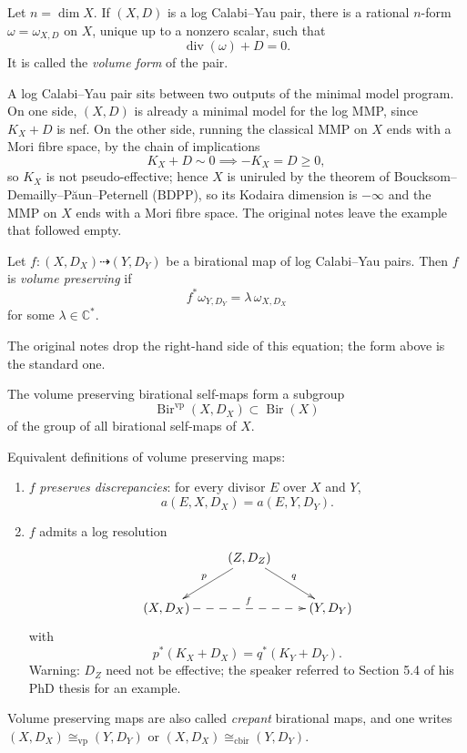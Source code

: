 \begin{remark}
\label{remark-alves-volume-form}
Let $n=\dim X$. If $(X,D)$ is a log
Calabi--Yau pair, there is a rational
$n$-form $\omega=\omega_{X,D}$ on $X$,
unique up to a nonzero scalar, such that
$$
\operatorname{div}(\omega)+D=0.
$$
It is called the \emph{volume form} of the
pair.
\end{remark}

A log Calabi--Yau pair sits between two
outputs of the minimal model program. On one
side, $(X,D)$ is already a minimal model for
the log MMP, since $K_X+D$ is nef. On the
other side, running the classical MMP on
$X$ ends with a Mori fibre space, by the
chain of implications
$$
K_X+D\sim 0
\implies
-K_X=D\geq 0,
$$
so $K_X$ is not pseudo-effective; hence $X$
is uniruled by the theorem of
Boucksom--Demailly--Păun--Peternell (BDPP),
so its Kodaira dimension is $-\infty$ and
the MMP on $X$ ends with a Mori fibre space.
The original notes leave the example that
followed empty.

\begin{definition}
\label{definition-alves-volume-preserving}
Let
$f\colon (X,D_X)\dashrightarrow (Y,D_Y)$ be
a birational map of log Calabi--Yau pairs.
Then $f$ is \emph{volume preserving} if
$$
f^*\omega_{Y,D_Y}=\lambda\,\omega_{X,D_X}
$$
for some $\lambda\in\mathbb{C}^*$.
\end{definition}

The original notes drop the right-hand side
of this equation; the form above is the
standard one.

\begin{remark}
\label{remark-alves-bir-vp}
The volume preserving birational
self-maps form a subgroup
$$
\operatorname{Bir}^{\operatorname{vp}}(X,D_X)
\subset \operatorname{Bir}(X)
$$
of the group of all birational
self-maps of $X$.
\end{remark}

Equivalent definitions of volume preserving
maps:
\begin{enumerate}
\item $f$ \emph{preserves discrepancies}:
for every divisor $E$ over $X$ and $Y$,
$$
a(E,X,D_X)=a(E,Y,D_Y).
$$
\item $f$ admits a log resolution
$$
\xymatrix{
& (Z,D_Z) \ar[ld]_p \ar[rd]^q & \\
(X,D_X) \ar@{-->}[rr]^f & & (Y,D_Y)
}
$$
with
$$
p^*(K_X+D_X)=q^*(K_Y+D_Y).
$$
Warning: $D_Z$ need not be effective; the
speaker referred to Section 5.4 of his PhD
thesis for an example.
\end{enumerate}
Volume preserving maps are also called
\emph{crepant} birational maps, and one
writes $(X,D_X)\cong_{\operatorname{vp}}
(Y,D_Y)$ or
$(X,D_X)\cong_{\operatorname{cbir}}(Y,D_Y)$.

